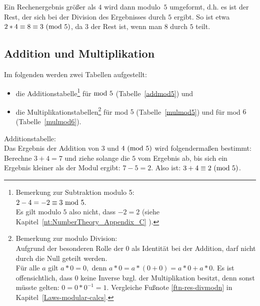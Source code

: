 \begin{refsegment}
Ein Rechenergebnis größer als $4$ wird dann \glqq modulo\grqq~$5$ umgeformt, d.h.
es ist der Rest, der sich bei der Division des Ergebnisses durch $5$ ergibt.
So ist etwa $2*4 \equiv 8 \equiv 3 {\rm ~(mod~ } 5)$, da $3$ der Rest ist,
wenn man $8$ durch $5$ teilt.


\subsection{Addition und Multiplikation} 
\label{addmult}

Im folgenden werden zwei Tabellen aufgestellt:
\begin{itemize}

\item die Additionstabelle\footnote{%
      Bemerkung zur Subtraktion modulo 5:\\
      $2 - 4 = -2 \equiv 3{\rm ~mod~}5.$\\
      Es gilt modulo $5$ also nicht, dass $-2 = 2$
      (siehe Kapitel~\ref{nt:NumberTheory_Appendix_C}
      \glqq {}\grqq).
      }
für ${\rm mod~ } 5$ (Tabelle~\ref{addmod5}) und

\item die Multiplikationstabellen\footnote{\label{ftn-mod6}%
Bemerkung zur modulo Division:\\
Aufgrund der besonderen Rolle der $0$ als Identität bei der Addition,
darf nicht durch die Null geteilt werden.\\
Für alle $a$ gilt $a*0=0, $ denn $a*0 = a*(0+0) =a*0 + a*0.$ Es ist
offensichtlich, dass $0$ keine Inverse bzgl. der Multiplikation besitzt,
denn sonst müsste gelten: $0 = 0 * 0^{-1} = 1.$ Vergleiche Fußnote
\ref{ftn-res-divmodn} in Kapitel~\ref{Laws-modular-calcs}.  }
für mod $5$ (Tabelle~\ref{mulmod5}) und für mod $6$ (Tabelle~\ref{mulmod6}).

\end{itemize}


\begin{example}{ Additionstabelle:}\\
Das Ergebnis der Addition von $3$ und $4 {\rm ~(mod~ } 5)$ wird folgendermaßen
bestimmt:
Berechne $3 + 4 = 7$ und ziehe solange die $5$ vom Ergebnis ab, bis sich ein
Ergebnis kleiner als der Modul ergibt: $7 - 5 = 2$.
Also ist: $3 + 4 \equiv 2 {\rm ~(mod~ } 5)$.


\end{example}
\end{refsegment}
